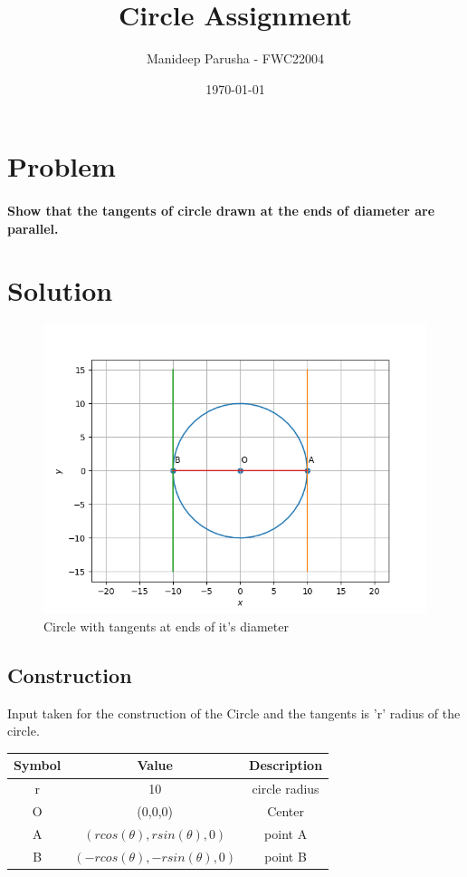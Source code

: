 \documentclass[journal,12pt,twocolumn]{article}
\title{\textbf{Circle Assignment}}
\author{Manideep Parusha - FWC22004}
\date{\today}
\begin{document}
\maketitle
\section*{Problem}
\paragraph{Show that the tangents of circle drawn at the ends of diameter are parallel.}

\section*{Solution}

\begin{figure}[h]
\centering
\includegraphics[width=\columnwidth]{figs/plot_cir.png}
\caption{Circle with tangents at ends of it's diameter}
\label{fig:cir_py}
\end{figure}

\subsection*{Construction}
Input taken for the construction of the Circle and the tangents is 'r' radius of the circle.

\begin{table}[h]
	\centering
\setlength\extrarowheight{2pt}
	\begin{tabular}{|c|c|c|}
		\hline
		\textbf{Symbol} & \textbf{Value} & \textbf{Description} \\
		\hline
		r & 10 & circle radius\\
		\hline
		O & (0,0,0) & Center\\
		\hline
		A & $(rcos(\theta),rsin(\theta),0)$ & point A\\
		\hline
		B & $(-rcos(\theta),-rsin(\theta),0)$ & point B\\
		\hline
	\end{tabular}
\end{table}
\end{document}
